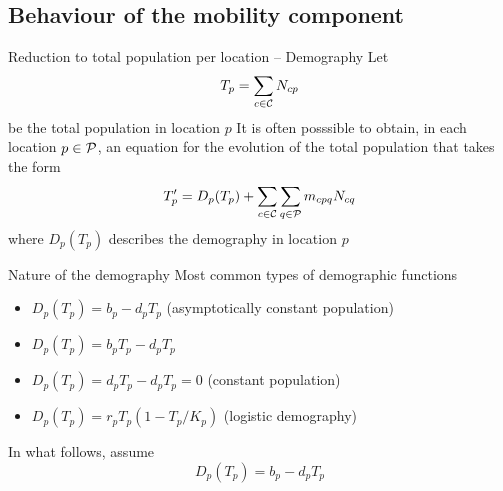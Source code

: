 \documentclass[aspectratio=43]{beamer}
\begin{document}
\subsection{Behaviour of the mobility component}


\begin{frame}{Reduction to total population per location -- Demography}
Let 
\[
	T_p = \sum_{c\in\C}N_{cp}
\]
be the total population in location $p$
\vfill
It is often posssible to obtain, in each location $p\in\P$, an equation for the evolution of the total population that takes the form
\begin{equation}\label{eq:dT_total_population}
	T_p' = 
	D_p(T_p)+\sum_{c\in\C}\sum_{q\in\P}m_{cpq}N_{cq}
\end{equation}
where $D_p(T_p)$ describes the demography in location $p$
\end{frame}

\begin{frame}{Nature of the demography}
	Most common types of demographic functions
	\begin{itemize}
		\item $D_p(T_p)=b_p-d_pT_p$ (asymptotically constant population)
		\item $D_p(T_p)=b_pT_p-d_pT_p$ 
		\item $D_p(T_p)=d_pT_p-d_pT_p=0$ (constant population)
		\item $D_p(T_p)=r_pT_p(1-T_p/K_p)$ (logistic demography)
	\end{itemize}
	\vfill
	In what follows, assume 
	\begin{equation}\label{eq:demography_function}
		D_p(T_p)=b_p-d_pT_p
	\end{equation}
\end{frame}
\end{document}
